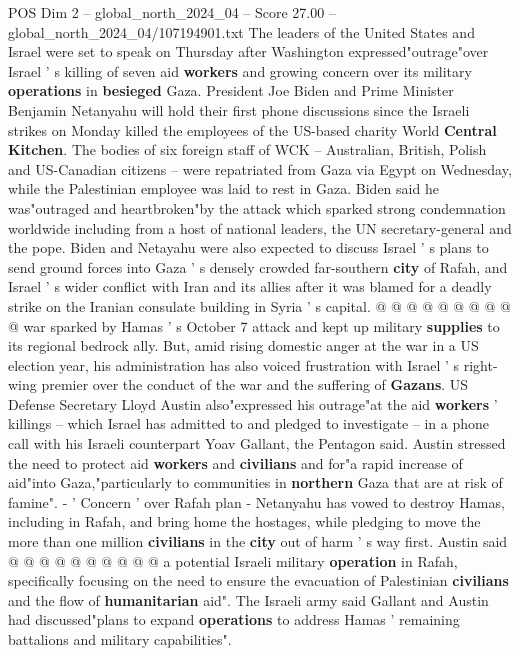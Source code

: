 \begin{textsample}{POS Dim 2 – global\_north\_2024\_04 – Score 27.00 – global\_north\_2024\_04/107194901.txt}  \label{ex:f2_pos_267}
The leaders of the United States and Israel were set to speak on Thursday after Washington expressed"outrage"over Israel ' s killing of seven aid \textbf{workers} and growing concern over its military \textbf{operations} in \textbf{besieged} Gaza.
President Joe Biden and Prime Minister Benjamin Netanyahu will hold their first phone discussions since the Israeli strikes on Monday killed the employees of the US-based charity World \textbf{Central} \textbf{Kitchen}.
The bodies of six foreign staff of WCK -- Australian, British, Polish and US-Canadian citizens -- were repatriated from Gaza via Egypt on Wednesday, while the Palestinian employee was laid to rest in Gaza.
Biden said he was"outraged and heartbroken"by the attack which sparked strong condemnation worldwide including from a host of national leaders, the UN secretary-general and the pope.
Biden and Netayahu were also expected to discuss Israel ' s plans to send ground forces into Gaza ' s densely crowded far-southern \textbf{city} of Rafah, and Israel ' s wider conflict with Iran and its allies after it was blamed for a deadly strike on the Iranian consulate building in Syria ' s capital. @ @ @ @ @ @ @ @ @ @ war sparked by Hamas ' s October 7 attack and kept up military \textbf{supplies} to its regional bedrock ally.
But, amid rising domestic anger at the war in a US election year, his administration has also voiced frustration with Israel ' s right-wing premier over the conduct of the war and the suffering of \textbf{Gazans}.
US Defense Secretary Lloyd Austin also"expressed his outrage"at the aid \textbf{workers} ' killings -- which Israel has admitted to and pledged to investigate -- in a phone call with his Israeli counterpart Yoav Gallant, the Pentagon said.
Austin stressed the need to protect aid \textbf{workers} and \textbf{civilians} and for"a rapid increase of aid"into Gaza,"particularly to communities in \textbf{northern} Gaza that are at risk of famine". - ' Concern ' over Rafah plan - Netanyahu has vowed to destroy Hamas, including in Rafah, and bring home the hostages, while pledging to move the more than one million \textbf{civilians} in the \textbf{city} out of harm ' s way first.
Austin said @ @ @ @ @ @ @ @ @ @ a potential Israeli military \textbf{operation} in Rafah, specifically focusing on the need to ensure the evacuation of Palestinian \textbf{civilians} and the flow of \textbf{humanitarian} aid".
The Israeli army said Gallant and Austin had discussed"plans to expand \textbf{operations} to address Hamas ' remaining battalions and military capabilities".

\end{textsample}
